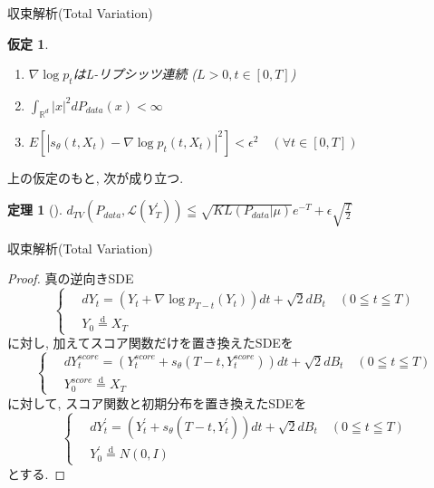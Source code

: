 \documentclass[dvipdfmx,11pt]{beamer}
\theoremstyle{plain}
\newtheorem{thm}{定理}
\newtheorem{assumption}{仮定}
\theoremstyle{定義}
\begin{document}
  \begin{frame}{収束解析(Total Variation)}
    \begin{assumption}
      \begin{enumerate}
        \item $\nabla \log{p_t}$はL-リプシッツ連続  ($L>0, t\in [0,T]$)
        \item $\int_{\mathbb{R}^d}|x|^2dP_{data}(x)<\infty$
        \item $E[|s_\theta(t,X_t)-\nabla\log{p_t(t,X_t)}|^2]<\epsilon^2 \quad (\forall t\in [0,T])$
      \end{enumerate}
    \end{assumption}
    上の仮定のもと, 次が成り立つ.
    \begin{thm}[\cite{chen_et_al_2023}]
      $d_{TV}(P_{data},\mathcal{L}(Y^{\prime}_T))\leqq \sqrt{KL(P_{data}|\mu)}e^{-T}+\epsilon \sqrt{\frac{T}{2}}$
    \end{thm}
  \end{frame}
  \begin{frame}{収束解析(Total Variation)}
    \begin{proof}
      真の逆向きSDE
      \begin{equation}
          \left\{ \,
              \begin{aligned}
              & dY_t = (Y_t+\nabla \log{p_{T-t}(Y_t)})dt+\sqrt{2}dB_t \quad (0\leqq t \leqq T) \\
              & Y_0 \stackrel{\mathrm{d}}{=} X_T
              \end{aligned}
          \right.
      \end{equation}
      に対し, 加えてスコア関数だけを置き換えたSDEを
      \begin{equation}
        \left\{ \,
            \begin{aligned}
            & dY^{score}_t = (Y^{score}_t+s_{\theta}(T-t,Y^{score}_t))dt+\sqrt{2}dB_t \quad (0\leqq t \leqq T) \\
            & Y^{score}_0 \stackrel{\mathrm{d}}{=} X_T
            \end{aligned}
        \right.
      \end{equation}
      に対して, スコア関数と初期分布を置き換えたSDEを
      \begin{equation}
          \left\{ \,
              \begin{aligned}
              & dY^{\prime}_t = (Y^{\prime}_t+s_{\theta}(T-t,Y^{\prime}_t))dt+\sqrt{2}dB_t \quad (0\leqq t \leqq T) \\
              & Y^{\prime}_0 \stackrel{\mathrm{d}}{=} N(0,I)
              \end{aligned}
          \right.
      \end{equation}
      とする.
    \end{proof}
  \end{frame}
\end{document}
